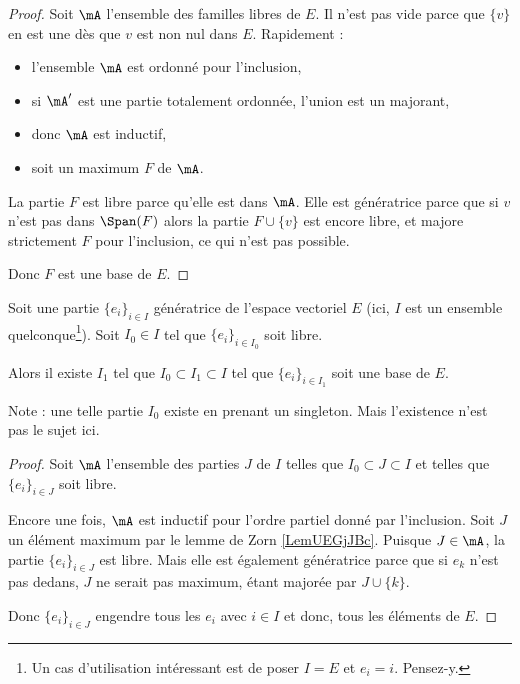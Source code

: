 \begin{proof}
	Soit \( \mA\) l'ensemble des familles libres de \( E\). Il n'est pas vide parce que \( \{ v \}\) en est une dès que \( v\) est non nul dans \( E\). Rapidement :
	\begin{itemize}
		\item l'ensemble \( \mA\) est ordonné pour l'inclusion,
		\item si \( \mA'\) est une partie totalement ordonnée, l'union est un majorant,
		\item donc \( \mA\) est inductif,
		\item soit un maximum \( F\) de \( \mA\).
	\end{itemize}
	La partie \( F\) est libre parce qu'elle est dans \( \mA\). Elle est génératrice parce que si \( v\) n'est pas dans \( \Span(F)\) alors la partie \( F\cup\{ v \}\) est encore libre, et majore strictement \( F\) pour l'inclusion, ce qui n'est pas possible.

	Donc \( F\) est une base de \( E\).
\end{proof}

\begin{theorem}      \label{THOooOQLQooHqEeDK}
	Soit une partie \( \{ e_i \}_{i\in I}\) génératrice de l'espace vectoriel \( E\) (ici, \( I\) est un ensemble quelconque\footnote{Un cas d'utilisation intéressant est de poser \( I=E\) et \( e_i=i\). Pensez-y.}). Soit \( I_0\in I\) tel que \( \{ e_i \}_{i\in I_0}\) soit libre.

	Alors il existe \( I_1\) tel que \( I_0\subset I_1\subset I\) tel que \( \{ e_i \}_{i\in I_1}\) soit une base de \( E\).
\end{theorem}

Note : une telle partie \( I_0\) existe en prenant un singleton. Mais l'existence n'est pas le sujet ici.

\begin{proof}
	Soit \( \mA\) l'ensemble des parties \( J\) de \( I\) telles que \( I_0\subset J\subset I\) et telles que \( \{ e_i \}_{i\in J}\) soit libre.

	Encore une fois, \( \mA\) est inductif pour l'ordre partiel donné par l'inclusion. Soit \( J\) un élément maximum par le lemme de Zorn \ref{LemUEGjJBc}. Puisque \( J\in\mA\), la partie \( \{ e_i \}_{i\in J}\) est libre. Mais elle est également génératrice parce que si \( e_k\) n'est pas dedans, \( J\) ne serait pas maximum, étant majorée par \( J\cup\{ k \}\).

	Donc \( \{ e_i \}_{i\in J}\) engendre tous les \( e_i\) avec \( i\in I\) et donc, tous les éléments de \( E\).
\end{proof}

